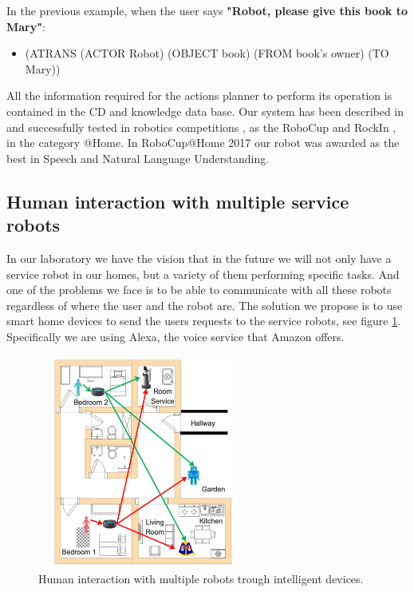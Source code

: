 \documentclass{llncs}
\begin{document}
In the previous example, when the user says {\bf "Robot, please give this book to Mary"}: 
\begin{itemize}
\item []
	(ATRANS (ACTOR Robot) (OBJECT book) (FROM book's owner) (TO Mary))
\end{itemize}

All the information required for the actions planner to perform its operation is contained in the CD and knowledge data base. 
Our system has been described in  \cite{iros2017} and successfully tested in robotics competitions \cite{Savage}, as the RoboCup and RockIn 
\cite{Robocup_2017}, in the category @Home.
In RoboCup@Home 2017 our robot was awarded as the best in Speech and Natural Language Understanding.


\subsection{Human interaction with multiple service robots}\label{subsec:Alexa}

In our laboratory we have the vision that in the future we will not only have a service robot in our homes, 
but a variety of them performing specific tasks. 
And one of the problems we face is to be able to communicate with all these robots regardless of where the user and the robot are.
The solution we propose is to use smart home devices to send the users requests to the service robots, see figure \ref{fig:alexahome}. 
Specifically we are using Alexa, 
the voice service that Amazon offers.

\begin{figure}[h]
	\centering
	\includegraphics[angle=0, height=7cm, width=7cm]{Figures/alexa1.png}
	\caption{Human interaction with multiple robots trough intelligent devices.}
	\label{fig:alexahome}
\end{figure}
\end{document}
